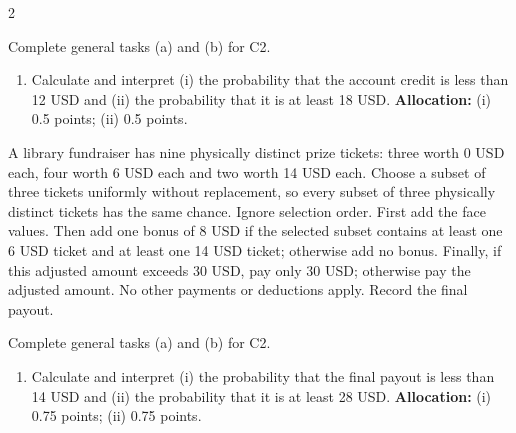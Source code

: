 \begin{multicols*}{2}
\begin{minipage}{\linewidth}
Complete general tasks (a)  and (b)  for C2.
\begin{enumerate}[label=(\alph*),start=3]
\item {} Calculate and interpret (i) the probability that the account credit is less than 12 USD and (ii) the probability that it is at least 18 USD.
\textbf{Allocation:} (i) 0.5 points; (ii) 0.5 points.
\end{enumerate}
\end{minipage}\par\medskip

\noindent\begin{minipage}{\linewidth}
A library fundraiser has nine physically distinct prize tickets: three worth 0 USD each, four worth 6 USD each and two worth 14 USD each. Choose a subset of three tickets uniformly without replacement, so every subset of three physically distinct tickets has the same chance. Ignore selection order. First add the face values. Then add one bonus of 8 USD if the selected subset contains at least one 6 USD ticket and at least one 14 USD ticket; otherwise add no bonus. Finally, if this adjusted amount exceeds 30 USD, pay only 30 USD; otherwise pay the adjusted amount. No other payments or deductions apply. Record the final payout.

Complete general tasks (a)  and (b)  for C2.
\begin{enumerate}[label=(\alph*),start=3]
\item {} Calculate and interpret (i) the probability that the final payout is less than 14 USD and (ii) the probability that it is at least 28 USD.
\textbf{Allocation:} (i) 0.75 points; (ii) 0.75 points.
\end{enumerate}
\end{minipage}\par\medskip

\end{multicols*}


